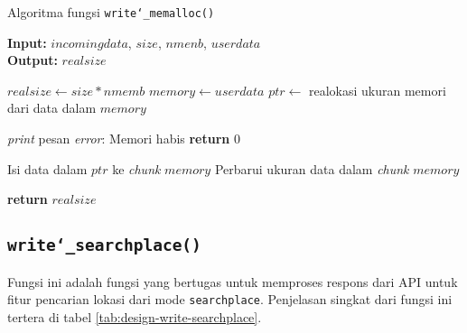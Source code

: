 \begin{algorithm}[h]
	\caption{Algoritma fungsi \texttt{write\char`_memalloc()}}
	\label{alg:design-write-memalloc}
	\vspace{-0.6\baselineskip}
	\begin{flushleft}
		\textbf{Input:} $incomingdata$, $size$, $nmenb$, $userdata$ \\
		\textbf{Output:} $realsize$ \\
	\end{flushleft}
	\vspace{-1.05\baselineskip}
	\begin{algorithmic}
		\State $realsize \gets size * nmemb$  
		\State $memory \gets userdata$ 
		\State $ptr \gets$ realokasi ukuran memori dari data dalam $memory$
		
		 
			\State \textit{print} pesan \textit{error}: Memori habis
			\State \textbf{return} $0$ 
		\EndIf
		
		\State Isi data dalam $ptr$ ke \textit{chunk} $memory$
		\State Perbarui ukuran data dalam \textit{chunk} $memory$
		
		\State \textbf{return} $realsize$ 
	\end{algorithmic}
\end{algorithm}

\subsection{\texttt{write\char`_searchplace()}}
\label{sec:design-code-write-searchplace}

Fungsi ini adalah fungsi yang bertugas untuk memproses respons dari API untuk fitur pencarian lokasi dari mode \verb|searchplace|. Penjelasan singkat dari fungsi ini tertera di tabel \ref{tab:design-write-searchplace}.

